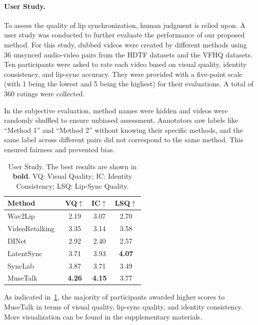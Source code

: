 \paragraph{User Study.}
To assess the quality of lip synchronization, human judgment is relied upon. A user study was conducted to further evaluate the performance of our proposed method. For this study, dubbed videos were created by different methods using 36 unsynced audio-video pairs from the HDTF datasets and the VFHQ datasets. 
Ten participants were asked to rate each video based on visual quality, identity consistency, and lip-sync accuracy. They were provided with a five-point scale (with 1 being the lowest and 5 being the highest) for their evaluations. A total of 360 ratings were collected.

In the subjective evaluation, method names were hidden and videos were randomly shuffled to ensure unbiased assessment. Annotators saw labels like 
``Method 1'' and ``Method 2'' without knowing their specific methods, and the same label across different pairs did not correspond to the same method. This ensured fairness and prevented bias.

\begin{table}[t]
\begin{center}
\begin{tabular}{lccc}
\toprule
\multicolumn{1}{l}{\bf Method} & \multicolumn{1}{c}{\bf VQ$\uparrow$} & \multicolumn{1}{c}{\bf IC$\uparrow$} & \multicolumn{1}{c}{\bf LSQ$\uparrow$} \\
\midrule

Wav2Lip~\cite{prajwal2020lip}    & 2.19 & 3.07 & 2.70 \\
VideoRetalking~\cite{cheng2022videoretalking}   & 3.35 & 3.14 & 3.58 \\
DINet~\cite{zhang2023dinet}    & 2.92 & 2.40 & 2.57 \\
LatentSync~\cite{li2024latentsync} & 3.71 & 3.93 & \bf{4.07}\\
SyncLab~\cite{sync_so_projects} & 3.87 & 3.71 & 3.49 \\
MuseTalk  & \bf{4.26} & \bf{4.15} & 3.77 \\
\bottomrule
\end{tabular}

\caption{User Study. The best results are shown in \textbf{bold}. VQ: Visual Quality; IC: Identity Consistency; LSQ: Lip-Sync Quality.}
\label{user-study}
\end{center}
\end{table}
As indicated in~\cref{user-study}, the majority of participants awarded higher scores to MuseTalk in terms of visual quality, lip-sync quality, and identity consistency. More visualization can be found in the supplementary materials.

